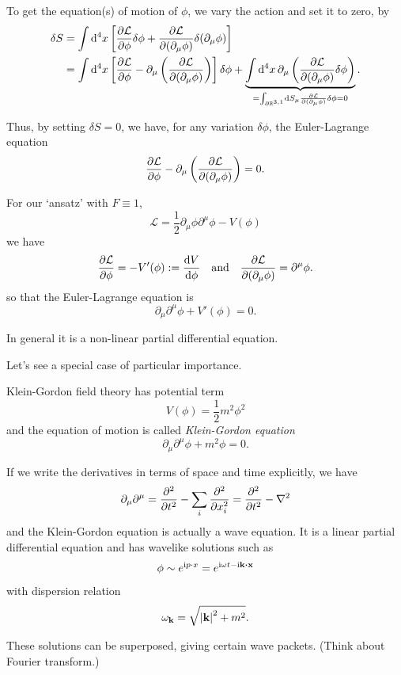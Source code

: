 \documentclass[a4paper,11pt]{article}
\begin{document}
	To get the equation(s) of motion of $\phi$, we vary the action and set it to zero, by
	\begin{align*}
		\delta S & = \int \dd[4]{x} \left[ \pdv{\mathcal{L}}{\phi} \delta \phi + \pdv{\mathcal{L}}{(\partial_\mu \phi)}\delta (\partial_\mu \phi) \right]\\
		& = \int \dd[4]{x} \left[ \pdv{\mathcal{L}}{\phi} - \partial_\mu \left( \pdv{\mathcal{L}}{(\partial_\mu \phi)} \right) \right] \delta \phi + \underbrace{\int \dd[4]{x} \partial_\mu \left( \pdv{\mathcal{L}}{(\partial_\mu \phi)} \delta \phi \right)}_{ = \int_{\partial \mathbb{R}^{3,1}} \dd{S_\mu} \pdv{\mathcal{L}}{(\partial_\mu \phi)} \delta \phi = 0}.
	\end{align*}

	Thus, by setting $\delta S = 0$, we have, for any variation $\delta \phi$, the Euler-Lagrange equation
	\begin{equation}
		\pdv{\mathcal{L}}{\phi} - \partial_\mu \left( \pdv{\mathcal{L}}{(\partial_\mu \phi)} \right) = 0.
	\end{equation}

	For our `ansatz' with $F \equiv 1$, 
	\begin{equation}
		\mathcal{L} = \frac{1}{2} \partial_\mu \phi \partial^\mu \phi - V(\phi)
	\end{equation}
	we have
	\[
		\pdv{\mathcal{L}}{\phi} = - V'(\phi) := \dv{V}{\phi} \quad \text{and} \quad \pdv{\mathcal{L}}{(\partial_\mu \phi)} = \partial^\mu \phi.
	\]
	so that the Euler-Lagrange equation is
	\begin{equation}
		\partial_\mu \partial^\mu \phi + V'(\phi) = 0.
		\label{eq:ELgen}
	\end{equation}
	
	In general it is a non-linear partial differential equation.

	Let's see a special case of particular importance.
	\begin{ex}
		Klein-Gordon field theory has potential term
		\[
			V(\phi) = \frac{1}{2} m^2 \phi^2
		\]
		and the equation of motion is called \emph{Klein-Gordon equation}
		\begin{equation}
			\boxed{\partial_\mu \partial^\mu \phi + m^2 \phi = 0}.
		\end{equation}

		If we write the derivatives in terms of space and time explicitly, we have
		\[
			\partial_\mu \partial^\mu = \pdv[2]{t} - \sum_i \pdv[2]{x_i} = \pdv[2]{t} - \laplacian
		\]
		and the Klein-Gordon equation is actually a wave equation. It is a linear partial differential equation and has wavelike solutions such as 
		\[
			\phi \sim e^{\mathrm{i} p \cdot x} = e^{\mathrm{i} \omega t - \mathrm{i} \vb k \vdot \vb x}
		\]
		with dispersion relation
		\[
			\omega_{\vb k} = \sqrt{\abs{\vb k}^2 + m^2}.
		\]
		
		These solutions can be superposed, giving certain wave packets. (Think about Fourier transform.)
	\end{ex}
\end{document}
